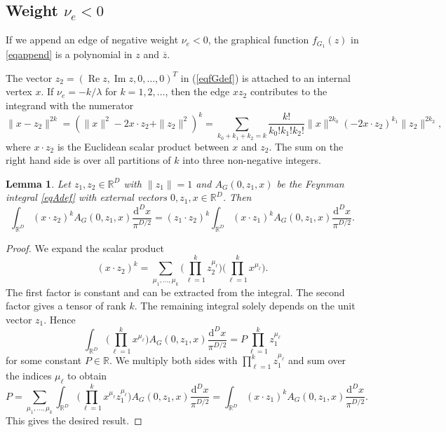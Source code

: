 \documentclass[oneside]{amsart}
\newcommand{\RR}{{\mathbb R}}
\newcommand{\dd}{\mathrm{d}}
\newcommand{\zz}{{\overline{z}}}
\renewcommand{\Im}{\mathop\mathrm{Im}}
\renewcommand{\Re}{\mathop\mathrm{Re}}
\theoremstyle{plain}
\newtheorem{lem}[thm]{Lemma}
\begin{document}
\subsection{Weight \texorpdfstring{$\nu_e<0$}{nu(e)<0}}\label{sectappendneg}
If we append an edge of negative weight $\nu_e<0$, the graphical function $f_{G_1}(z)$ in \eqref{eqappend} is a polynomial in $z$ and $\zz$.

The vector $z_2=(\Re z,\Im z,0,\ldots,0)^T$ in (\ref{eqfGdef}) is attached to an internal vertex $x$. If $\nu_e=-k/\lambda$ for $k=1,2,\ldots$, then the edge $xz_2$ contributes to the integrand with the numerator
\begin{equation}\label{eqnumer}
\|x-z_2\|^{2k}=(\|x\|^2-2x\cdot z_2+\|z_2\|^2)^k=\sum_{k_0+k_1+k_2=k}\frac{k!}{k_0!k_1!k_2!}\|x\|^{2k_0}(-2x\cdot z_2)^{k_1}\|z_2\|^{2k_2},
\end{equation}
where $x\cdot z_2$ is the Euclidean scalar product between $x$ and $z_2$. The sum on the right hand side is over all partitions of $k$ into three non-negative integers.

\begin{lem}\label{lemk}
Let $z_1,z_2\in\RR^D$ with $\|z_1\|=1$ and $A_G(0,z_1,x)$ be the Feynman integral \eqref{eqAdef} with external vectors $0,z_1,x\in\RR^D$.
Then
\begin{equation}\label{eqpropk}
\int_{\RR^D}(x\cdot z_2)^kA_G(0,z_1,x)\frac{\dd^Dx}{\pi^{D/2}}=(z_1\cdot z_2)^k\int_{\RR^D}(x\cdot z_1)^kA_G(0,z_1,x)\frac{\dd^Dx}{\pi^{D/2}}.
\end{equation}
\end{lem}
\begin{proof}
We expand the scalar product
$$
(x\cdot z_2)^k=\sum_{\mu_1,\ldots,\mu_k}\Big(\prod_{\ell=1}^kz_2^{\mu_\ell}\Big)\Big(\prod_{\ell=1}^kx^{\mu_\ell}\Big).
$$
The first factor is constant and can be extracted from the integral. The second factor gives a tensor of rank $k$. The remaining integral solely depends on the unit vector $z_1$.
Hence
$$
\int_{\RR^D}\Big(\prod_{\ell=1}^kx^{\mu_\ell}\Big)A_G(0,z_1,x)\frac{\dd^Dx}{\pi^{D/2}}=P\prod_{\ell=1}^kz_1^{\mu_\ell}
$$
for some constant $P\in\RR$. We multiply both sides with $\prod_{\ell=1}^kz_1^{\mu_\ell}$ and sum over the indices $\mu_\ell$ to obtain
$$
P=\sum_{\mu_1,\ldots,\mu_k}\int_{\RR^D}\Big(\prod_{\ell=1}^kx^{\mu_\ell}z_1^{\mu_\ell}\Big)A_G(0,z_1,x)\frac{\dd^Dx}{\pi^{D/2}}=\int_{\RR^D}(x\cdot z_1)^kA_G(0,z_1,x)\frac{\dd^Dx}{\pi^{D/2}}.
$$
This gives the desired result.
\end{proof}
\end{document}
